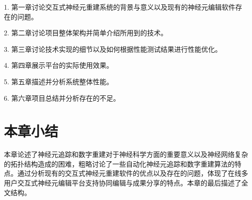 1. 第一章讨论交互式神经元重建系统的背景与意义以及现有的神经元编辑软件存在的问题。

2. 第二章讨论项目整体架构并简单介绍所用到的技术。

3. 第三章讨论技术实现的细节以及如何根据性能测试结果进行性能优化。

4. 第四章展示平台的实际使用效果。

5. 第五章描述并分析系统整体性能。

6. 第六章项目总结并分析存在的不足。

\section{本章小结}
本章论述了神经元追踪和数字重建对于神经科学方面的重要意义以及神经网络复杂的拓扑结构造成的困难，粗略讨论了一些自动化神经元追踪和数字重建算法的特点。通过分析现有的交互式神经元重建软件的优点以及存在的问题，体现了在线多用户交互式神经元编辑平台支持协同编辑与成果分享的特点。本章的最后描述了全文结构。

